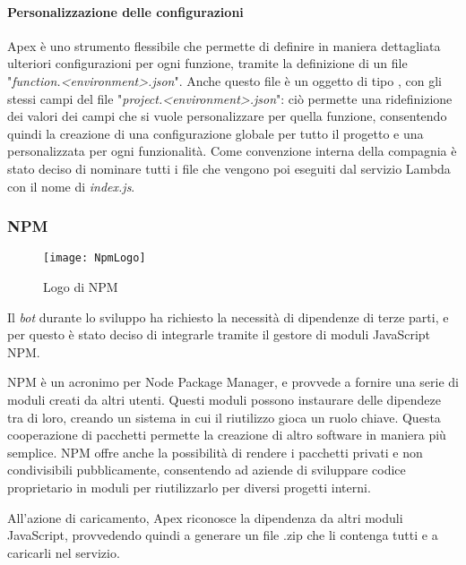 \paragraph*{Personalizzazione delle configurazioni} Apex è uno strumento
flessibile che permette di definire in maniera dettagliata ulteriori
configurazioni per ogni funzione, tramite la definizione di un file
"\textit{function.<environment>.json}". Anche questo file è un oggetto di tipo
, con gli stessi campi del file
"\textit{project.<environment>.json}": ciò permette una ridefinizione dei valori
dei campi che si vuole personalizzare per quella funzione, consentendo quindi
la creazione di una configurazione globale per tutto il progetto e una
personalizzata per ogni funzionalità.
Come convenzione interna della compagnia è stato deciso di nominare tutti i
file che vengono poi eseguiti dal servizio Lambda con il nome di
\textit{index.js}.

\subsubsection{NPM}
\begin{figure}[H]
  \centering
  \texttt{[image: NpmLogo]}
  \caption{Logo di NPM}
\end{figure}

Il \textit{bot} durante lo sviluppo ha richiesto la
necessità di dipendenze di terze parti, e per questo è stato deciso di
integrarle tramite il gestore di moduli JavaScript NPM.

NPM è un acronimo per Node Package Manager, e provvede a fornire una serie di
moduli creati da altri utenti. Questi moduli possono instaurare delle dipendeze
tra di loro, creando un sistema in cui il riutilizzo gioca un ruolo chiave.
Questa cooperazione di pacchetti permette la creazione di altro software in
maniera più semplice.
NPM offre anche la possibilità di rendere i pacchetti privati e non
condivisibili pubblicamente, consentendo ad aziende di sviluppare codice
proprietario in moduli per riutilizzarlo per diversi progetti interni.

All'azione di caricamento, Apex riconosce la dipendenza da altri moduli
JavaScript, provvedendo quindi a generare un file .zip che li contenga tutti e
a caricarli nel servizio.

